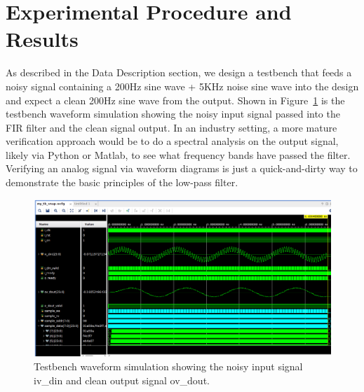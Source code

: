 \documentclass{article}
\begin{document}
\section{Experimental Procedure and Results}
    As described in the Data Description section,
    we design a testbench that feeds a noisy signal containing a 200Hz sine wave + 5KHz noise sine wave into the design and 
    expect a clean 200Hz sine wave from the output.
    Shown in Figure~\ref{fig:waveform} is the testbench waveform simulation showing the noisy input signal passed into the FIR filter
    and the clean signal output.
    In an industry setting, a more mature verification approach would be to do a spectral analysis on the output signal, likely via Python or Matlab,
    to see what frequency bands have passed the filter.
    Verifying an analog signal via waveform diagrams is just a quick-and-dirty way to demonstrate the basic principles of the low-pass filter.

    \begin{figure}
        \centering
        \includegraphics[width=1.25\textwidth]{figures/waveform.png}
        \caption{
            Testbench waveform simulation showing the noisy input signal iv\_din and clean output signal ov\_dout.
        }
        \label{fig:waveform}
    \end{figure}
\end{document}

